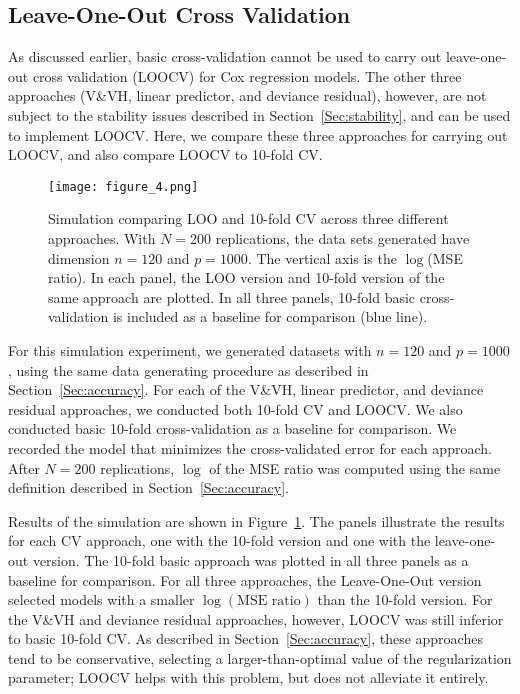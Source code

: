 \subsection {Leave-One-Out Cross Validation}
\label{Sec:loocv}

As discussed earlier, basic cross-validation cannot be used to carry out leave-one-out cross validation (LOOCV) for Cox regression models. The other three approaches (V\&VH, linear predictor, and deviance residual), however, are not subject to the stability issues described in Section~\ref{Sec:stability}, and can be used to implement LOOCV.  Here, we compare these three approaches for carrying out LOOCV, and also compare LOOCV to 10-fold CV.

\begin{figure}[!htb]
  \centering
  \texttt{[image: figure\_4.png]}
  \caption{\label{Fig:loocv}Simulation comparing LOO and 10-fold CV across three different approaches. With $N = 200$ replications, the data sets generated have dimension $n = 120$ and $p = 1000$. The vertical axis is the $\log$(MSE ratio). In each panel, the LOO version and 10-fold version of the same approach are plotted. In all three panels, 10-fold basic cross-validation is included as a baseline for comparison (blue line).}
\end{figure}	

For this simulation experiment, we generated datasets with $n = 120$ and $p = 1000$, using the same data generating procedure as described in Section~\ref{Sec:accuracy}. For each of the V\&VH, linear predictor, and deviance residual approaches, we conducted both 10-fold CV and LOOCV. We also conducted basic 10-fold cross-validation as a baseline for comparison. We recorded the model that minimizes the cross-validated error  for each approach. After $N = 200$ replications, $\log$ of the MSE ratio was computed using the same definition described in Section~\ref{Sec:accuracy}.

Results of the simulation are shown in Figure~\ref{Fig:loocv}. The panels illustrate the results for each CV approach, one with the 10-fold version and one with the leave-one-out version. The 10-fold basic approach was plotted in all three panels as a baseline for comparison.  For all three approaches, the Leave-One-Out version selected models with a smaller $\log(\text{MSE ratio})$ than the 10-fold version. For the V\&VH and deviance residual approaches, however, LOOCV was still inferior to basic 10-fold CV.  As described in Section~\ref{Sec:accuracy}, these approaches tend to be conservative, selecting a larger-than-optimal value of the regularization parameter; LOOCV helps with this problem, but does not alleviate it entirely.

